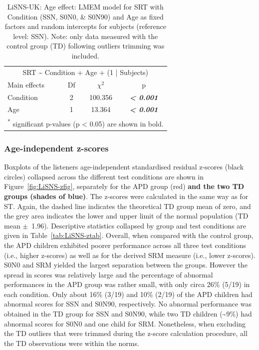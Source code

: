 \documentclass[a4paper, twoside]{templates/ociamthesis}
\begin{document}
\begin{table}

\caption{\label{tab:LiSNS-AgeLMEMTab}LiSNS-UK: Age effect: LMEM model for SRT with Condition (SSN, S0N0, \& S0N90) and Age as fixed factors and random intercepts for subjects (reference level: SSN). Note: only data measured with the control group (TD) following outliers trimming was included.}
\centering
\begin{tabular}[t]{lcc>{}c}
\toprule
\multicolumn{4}{c}{SRT \textasciitilde{} Condition + Age + (1 | Subjects)} \\
\cmidrule(l{3pt}r{3pt}){1-4}
Main effects & Df & $\chi^{2}$ & p\\
\midrule
Condition & 2 & 100.356 & \em{\textbf{< 0.001}}\\
Age & 1 & 13.364 & \em{\textbf{< 0.001}}\\
\bottomrule
\multicolumn{4}{l}{\textsuperscript{*} significant p-values (p < 0.05) are shown in bold.}\\
\end{tabular}
\end{table}

\hypertarget{age-independent-z-scores-2}{%
\subsubsection*{Age-independent z-scores}\label{age-independent-z-scores-2}}

Boxplots of the listeners age-independent standardised residual z-scores (black circles) collapsed across the different test conditions are shown in Figure~\ref{fig:LiSNS-zfig}, separately for the APD group (red) \textbf{and the two TD groups (shades of blue)}. The z-scores were calculated in the same way as for ST. Again, the dashed line indicates the theoretical TD group mean of zero, and the grey area indicates the lower and upper limit of the normal population (TD mean \(\pm\)~1.96). Descriptive statistics collapsed by group and test conditions are given in Table~\ref{tab:LiSNS-ztab}. Overall, when compared with the control group, the APD children exhibited poorer performance across all three test conditions (i.e., higher z-scores) as well as for the derived SRM measure (i.e., lower z-scores).\\

S0N0 and SRM yielded the largest separation between the groups. However the spread in scores was relatively large and the percentage of abnormal performances in the APD group was rather small, with only circa 26\% (5/19) in each condition. Only about 16\% (3/19) and 10\% (2/19) of the APD children had abnormal scores for SSN and S0N90, respectively. No abnormal performance was obtained in the TD group for SSN and S0N90, while two TD children (\textasciitilde9\%) had abnormal scores for S0N0 and one child for SRM. Nonetheless, when excluding the TD outliers that were trimmed during the z-score calculation procedure, all the TD observations were within the norms.\\
\end{document}
